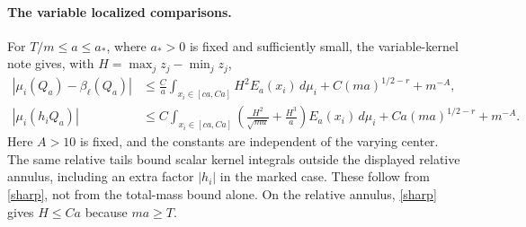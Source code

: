 \documentclass[11pt]{article}
\begin{document}
\paragraph{The variable localized comparisons.}
For $T/m\le a\le a_*$, where $a_*>0$ is fixed and sufficiently
small, the variable-kernel note gives, with $H=\max_j z_j-\min_jz_j$,
\begin{align}
 |\mu_i(Q_a)-\beta_\ell(Q_a)|
 &\le \frac C a\int_{x_i\in[c a,Ca]}H^2E_a(x_i)\,d\mu_i
       +C(ma)^{1/2-r}+m^{-A},\label{unmarked}\\
 |\mu_i(h_iQ_a)|
 &\le C\int_{x_i\in[c a,Ca]}
 \left(\frac{H^2}{\sqrt{ma}}+\frac{H^3}{a}\right)
 E_a(x_i)\,d\mu_i
       +Ca(ma)^{1/2-r}+m^{-A}.
 \label{marked}
\end{align}
Here $A>10$ is fixed, and the constants are independent of the
varying center. The same relative tails bound scalar kernel integrals
outside the displayed relative annulus, including an extra factor
$|h_i|$ in the marked case. These follow from \eqref{sharp}, not from
the total-mass bound alone. On the relative annulus,
\eqref{sharp} gives $H\le Ca$ because $ma\ge T$.
\end{document}
